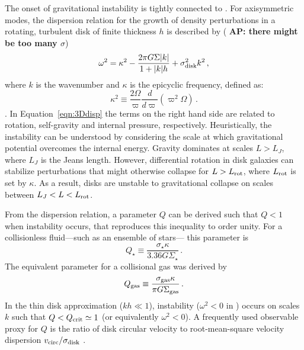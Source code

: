 \IfFileExists{emulateapjlegacy.cls}{\documentclass[iop]{emulateapjlegacy}}{\documentclass[iop]{emulateapj}}
\def\altomega{\varpi}
\newcommand{\AP}[1]{({\bf \color{apcolor} AP: #1})}
\begin{document}
The onset of gravitational instability is tightly connected to \SF \citep[e.g.,][]{Kennicutt89a, Wang94a, Li05b, Li06a}. For axisymmetric modes, the dispersion relation for the growth of density perturbations in a rotating, turbulent disk of finite thickness $h$ is described by \AP{there might be too many $\sigma$}
\begin{equation}
\omega^2 = \kappa^2 - \frac{2\pi G \Sigma |k|}{1 + |k| h} + \sigma_{\rm disk}^2 k^2\,,
\label{eqn:3Ddisp}
\end{equation}
where $k$ is the wavenumber and $\kappa$ is the epicyclic frequency, defined as:
\begin{equation}
\kappa^2\equiv\frac{2\Omega}{\altomega}\frac{d}{d\altomega}\left(\altomega^2\Omega\right)\,.
\label{eqn:kappa}
\end{equation}
\citep{Romeo92a}.
In Equation~\ref{eqn:3Ddisp} the terms on the right hand side are related to rotation, self-gravity and internal pressure, respectively. Heuristically, the instability can be understood by considering the scale at which gravitational potential overcomes the internal energy. Gravity dominates at scales $L > L_J$, where $L_J$ is the Jeans length. However, differential rotation in disk galaxies can stabilize perturbations that might otherwise collapse for $L > L_{\rm rot}$, where $L_{\rm rot}$ is set by $\kappa$. As a result, disks are unstable to gravitational collapse on scales between $L_J < L < L_{\rm rot}$.  

From the dispersion relation, a parameter $Q$ can be derived such that $Q < 1$ when instability occurs, that reproduces this inequality to order unity. For a collisionless fluid---such as an ensemble of stars--- this parameter is \citep{Toomre64a}
\begin{equation}
Q_{\star} \equiv\frac{\sigma_{\star}\kappa}{3.36 G \Sigma_{\star}}\,.
\end{equation}
The equivalent parameter for a collisional gas was derived by \citet{Goldreich65a}
\begin{equation}
Q_{\rm gas}\equiv\frac{\sigma_{\rm gas}\kappa}{\pi G \Sigma_{\rm gas}}\,.
\label{eqn:Q}
\end{equation}
In the thin disk approximation ($kh\ll1$), instability ($\omega^2 < 0$ in  ) occurs on scales $k$ such that $Q < Q_{\rm crit}\simeq1$ (or equivalently $\omega^2 < 0$). A frequently used observable proxy for $Q$ is the ratio of disk circular velocity to root-mean-square velocity dispersion $v_{\rm circ}/\sigma_{\rm disk}$ \citep[e.g.,][]{GarciaBurillo03a, Genzel11a, Kassin12a, Leung19a}.
%
\end{document}
